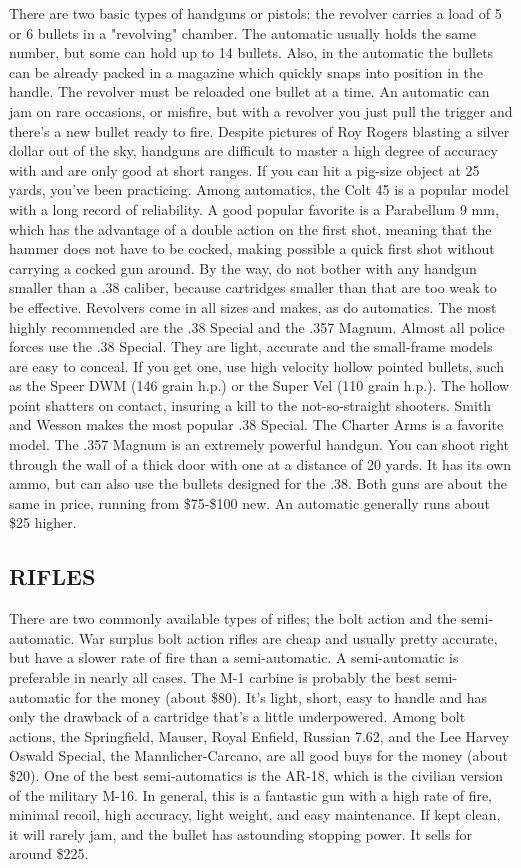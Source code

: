 \documentclass[11pt,twoside,a4paper]{book}
\begin{document}
There are two basic types of handguns or pistols: the revolver carries a load of 5 or 6 bullets in a "revolving" chamber. The automatic usually holds the same number, but some can hold up to 14 bullets. Also, in the automatic the bullets can be already packed in a magazine which quickly snaps into position in the handle. The revolver must be reloaded one bullet at a time. An automatic can jam on rare occasions, or misfire, but with a revolver you just pull the trigger and there's a new bullet ready to fire. Despite pictures of Roy Rogers blasting a silver dollar out of the sky, handguns are difficult to master a high degree of accuracy with and are only good at short ranges. If you can hit a pig-size object at 25 yards, you've been practicing. Among automatics, the Colt 45 is a popular model with a long record of reliability. A good popular favorite is a Parabellum 9 mm, which has the advantage of a double action on the first shot, meaning that the hammer does not have to be cocked, making possible a quick first shot without carrying a cocked gun around. By the way, do not bother with any handgun smaller than a .38 caliber, because cartridges smaller than that are too weak to be effective. Revolvers come in all sizes and makes, as do automatics.  The most highly recommended are the .38 Special and the .357 Magnum. Almost all police forces use the .38 Special. They are light, accurate and the small-frame models are easy to conceal. If you get one, use high velocity hollow pointed bullets, such as the Speer DWM (146 grain h.p.) or the Super Vel (110 grain h.p.). The hollow point shatters on contact, insuring a kill to the not-so-straight shooters. Smith and Wesson makes the most popular .38 Special. The Charter Arms is a favorite model. The .357 Magnum is an extremely powerful handgun. You can shoot right through the wall of a thick door with one at a distance of 20 yards. It has its own ammo, but can also use the bullets designed for the .38. Both guns are about the same in price, running from \$75-\$100 new. An automatic generally runs about \$25 higher.

\subsection{RIFLES}

There are two commonly available types of rifles; the bolt action and the semi-automatic. War surplus bolt action rifles are cheap and usually pretty accurate, but have a slower rate of fire than a semi-automatic. A semi-automatic is preferable in nearly all cases. The M-1 carbine is probably the best semi-automatic for the money (about \$80). It's light, short, easy to handle and has only the drawback of a cartridge that's a little underpowered. Among bolt actions, the Springfield, Mauser, Royal Enfield, Russian 7.62, and the Lee Harvey Oswald Special, the Mannlicher-Carcano, are all good buys for the money (about \$20). One of the best semi-automatics is the AR-18, which is the civilian version of the military M-16. In general, this is a fantastic gun with a high rate of fire, minimal recoil, high accuracy, light weight, and easy maintenance. If kept clean, it will rarely jam, and the bullet has astounding stopping power. It sells for around \$225.
\end{document}

